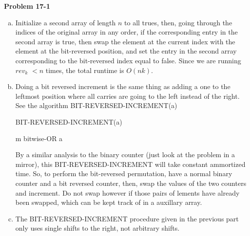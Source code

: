 \documentclass{article}
\begin{document}
\noindent\textbf{Problem 17-1}\\
\begin{enumerate}[a.]
\item
Initialize a second array of length $n$ to all trues, then, going through the indices of the original array in any order, if  the corresponding entry in the second array is true, then swap the element at the current index with the element at the bit-reversed position, and set the entry in the second array corresponding to the bit-reversed index equal to false. Since we are running $rev_k$ $< n$ times, the total runtime is $O(nk)$.
\item
Doing a bit reversed increment is the same thing as adding a one to the leftmost position where all carries are going to the left instead of the right. See the algorithm BIT-REVERSED-INCREMENT(a)

\begin{algorithm}
\caption{BIT-REVERSED-INCREMENT(a)}
\begin{algorithmic}
\EndWhile
\Return m bitwise-OR a
\end{algorithmic}
\end{algorithm}

By a similar analysis to the binary counter (just look at the problem in a mirror), this BIT-REVERSED-INCREMENT will take constant ammortized time. So, to perform the bit-reversed permutation, have a normal binary counter and a bit reversed counter, then, swap the values of the two counters and increment. Do not swap however if those pairs of lements have already been swapped, which can be kept track of in a auxillary array.

\item The BIT-REVERSED-INCREMENT procedure given in the previous part only uses single shifts to the right, not arbitrary shifts.

\end{enumerate}
\end{document}
